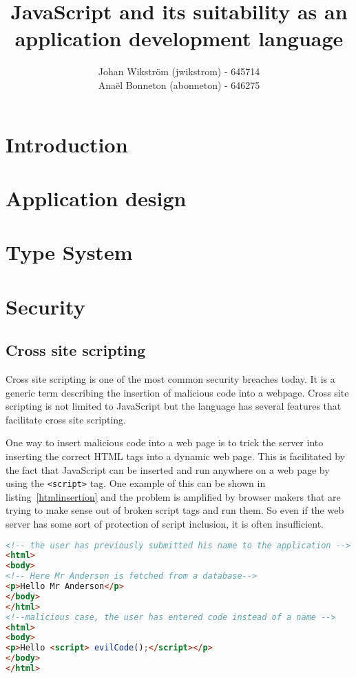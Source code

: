 \documentclass{report}
\title{JavaScript and its suitability as an application development language}
\author{Johan Wikström (jwikstrom) - 645714\\
Anaël Bonneton (abonneton) - 646275 
}
\begin{document}
\maketitle
\tableofcontents

\section{Introduction}


\section{Application design}


\section{Type System}


\section{Security}


\subsection{Cross site scripting}
Cross site scripting is one of the most common security breaches today. It is a generic term describing the insertion of malicious code into a webpage. Cross site scripting is not limited to JavaScript but the language has several features that facilitate cross site scripting.

One way to insert malicious code into a web page is to trick the server into inserting the correct HTML tags into a dynamic web page. This is facilitated by the fact that JavaScript can be inserted and run anywhere on a web page by using the \texttt{<script>} tag. One example of this can be shown in listing~\ref{htmlinsertion} and the problem is amplified by browser makers that are trying to make sense out of broken script tags and run them. So even if the web server has some sort of protection of script inclusion, it is often insufficient.
\begin{lstlisting}[caption={Insertion of malicious script on the server side},label={htmlinsertion},language={html}]
<!-- the user has previously submitted his name to the application -->
<html>
<body>
<!-- Here Mr Anderson is fetched from a database-->
<p>Hello Mr Anderson</p> 
</body>
</html>
<!--malicious case, the user has entered code instead of a name -->
<html>
<body>
<p>Hello <script> evilCode();</script></p>
</body>
</html>
\end{lstlisting}
\end{document}
